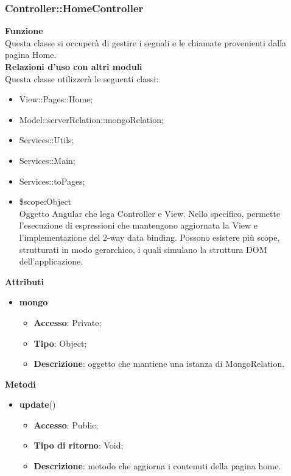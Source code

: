 {	\subsubsection{Controller::\-HomeController}{
		\label{sub:homecontroller}
		\textbf{Funzione}\\
		\indent Questa classe si occuperà di gestire i segnali e le chiamate provenienti dalla pagina Home.\\
		\textbf{Relazioni d'uso con altri moduli}\\
		\indent Questa classe utilizzerà le seguenti classi:
		\begin{itemize}
			\item View::\-Pages::\-Home;
			\item Model::\-serverRelation::\-mongoRelation;
			\item Services::\-Utils;
			\item Services::\-Main;
			\item Services::\-toPages;
			\item \$scope:Object\\
				\indent Oggetto Angular che lega Controller e View. Nello specifico, permette l'esecuzione di espressioni che mantengono aggiornata la View e l'implementazione del 2-way data binding. Possono esistere più scope, strutturati in modo gerarchico, i quali simulano la struttura DOM dell'applicazione.
		\end{itemize}
		\textbf{Attributi}\\
		\begin{itemize}
			\item \textbf{mongo}
			\begin{itemize}
				\item \textbf{Accesso}: Private;
				\item \textbf{Tipo}: Object;
				\item \textbf{Descrizione}: oggetto che mantiene una istanza di MongoRelation.
			\end{itemize}
	    \end{itemize}
		\textbf{Metodi}
		\begin{itemize}
			\item \textbf{update}()
			\begin{itemize}
				\item \textbf{Accesso}: Public;
				\item \textbf{Tipo di ritorno}: Void;
				\item \textbf{Descrizione}: metodo che aggiorna i contenuti della pagina home.
			\end{itemize}

\end{itemize}}}
